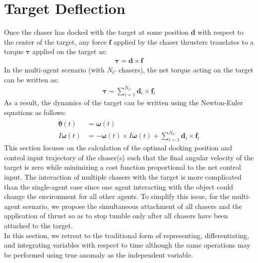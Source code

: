 \section{Target Deflection}
\label{sec:target-deflection}
Once the chaser has docked with the target at some position $\boldsymbol{d}$ with respect to the center of the target, any force $\boldsymbol{f}$ applied by the chaser thrusters translates to a torque $\boldsymbol{\tau}$ applied on the target as:
\begin{align}
    \boldsymbol{\tau} = \boldsymbol{d}\times\boldsymbol{f}
\end{align}
In the multi-agent scenario (with $N_C$ chasers), the net torque acting on the target can be written as:
\begin{align}
    \boldsymbol{\tau} = \sum_{i=1}^{N_C}\boldsymbol{d}_{i}\times\boldsymbol{f}_{i}
\end{align}
As a result, the dynamics of the target can be written using the Newton-Euler equations as follows:
\begin{align}
    \dot{\boldsymbol{\theta}}(t)&=\boldsymbol{\omega}(t)\\
    I\dot{\boldsymbol{\omega}}(t)&=-\boldsymbol{\omega}(t)\times I\boldsymbol{\omega}(t)+\sum_{i=1}^{N_C}\boldsymbol{d}_{i}\times\boldsymbol{f}_{i}
\label{eqn:newton-euler-target-detumbling}
\end{align}
This section focuses on the calculation of the optimal docking position and control input trajectory of the chaser(s) such that the final angular velocity of the target is zero while minimizing a cost function proportional to the net control input.
The interaction of multiple chasers with the target is more complicated than the single-agent case since one agent interacting with the object could change the environment for all other agents.
To simplify this issue, for the multi-agent scenario, we propose the simultaneous attachment of all chasers and the application of thrust so as to stop tumble only after all chasers have been attached to the target.\\
In this section, we retreat to the traditional form of representing, differentiating, and integrating variables with respect to time although the same operations may be performed using true anomaly as the independent variable.
